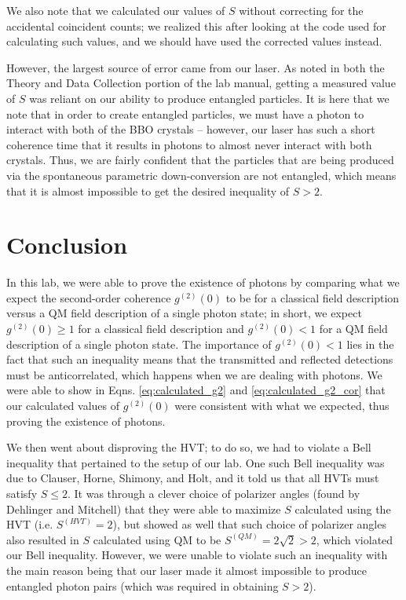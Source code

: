 \documentclass[twocolumn,amsmath,amssymb,pra]{revtex4-2}
\begin{document}
We also note that we calculated our values of $S$ without correcting for the accidental coincident counts; we realized this after looking at the code used for calculating such values, and we should have used the corrected values instead.

However, the largest source of error came from our laser.
As noted in both the Theory and Data Collection portion of the lab manual, getting a measured value of $S$ was reliant on our ability to produce entangled particles. It is here that we note that in order to create entangled particles, we must have a photon to interact with both of the BBO crystals -- however, our laser has such a short coherence time that it results in photons to almost never interact with both crystals. Thus, we are fairly confident that the particles that are being produced via the spontaneous parametric down-conversion are not entangled, which means that it is almost impossible to get the desired inequality of $S > 2$. 

\section{Conclusion}
In this lab, we were able to prove the existence of photons by comparing what we expect the second-order coherence $g^{(2)}(0)$ to be for a classical field description versus a QM field description of a single photon state; in short, we expect $g^{(2)}(0) \geq 1$ for a classical field description and $g^{(2)}(0) < 1$ for a QM field description of a single photon state. The importance of $g^{(2)}(0) < 1$ lies in the fact that such an inequality means that the transmitted and reflected detections must be anticorrelated, which happens when we are dealing with photons. We were able to show in Eqns. \ref{eq:calculated_g2} and \ref{eq:calculated_g2_cor} that our calculated values of $g^{(2)}(0)$ were consistent with what we expected, thus proving the existence of photons.

We then went about disproving the HVT; to do so, we had to violate a Bell inequality that pertained to the setup of our lab. One such Bell inequality was due to Clauser, Horne, Shimony, and Holt, and it told us that all HVTs must satisfy $S \leq 2$. It was through a clever choice of polarizer angles (found by Dehlinger and Mitchell) that they were able to maximize $S$ calculated using the HVT (i.e. $S^{(HVT)} = 2$), but showed as well that such choice of polarizer angles also resulted in $S$ calculated using QM to be $S^{(QM)} = 2 \sqrt{2} > 2$, which violated our Bell inequality. However, we were unable to violate such an inequality with the main reason being that our laser made it almost impossible to produce entangled photon pairs (which was required in obtaining $S > 2$).
\end{document}
